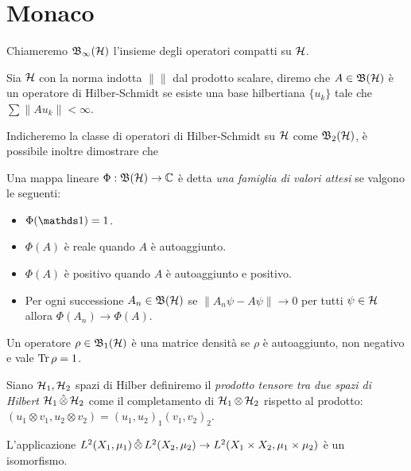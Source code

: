 \chapter{Monaco}


Chiameremo $\operatorname{\mathfrak{B}_\infty(\mathcal{H})}$ l'insieme degli operatori compatti su $\operatorname{\mathcal{H}}$.

\begin{definition}
    Sia $\operatorname{\mathcal{H}}$ con la norma indotta $\| \|$ dal prodotto scalare, diremo che $A \in \operatorname{\mathfrak{B}(\mathcal{H})}$ è un operatore di Hilber-Schmidt se esiste una base hilbertiana $\{ u_k\}$ tale che $\sum \|Au_k \|<\infty$. 
\end{definition}

Indicheremo la classe di operatori di Hilber-Schmidt su $\operatorname{\mathcal{H}}$ come $\operatorname{\mathfrak{B}_2(\mathcal{H})}$, è possibile inoltre dimostrare che 





\begin{definition}
    Una mappa lineare $\Phi : \operatorname{\mathfrak{B}(\mathcal{H})} \to \mathbb{C}$ è detta \emph{ una famiglia di valori attesi} se valgono le seguenti:

\begin{itemize}
    \item $\Phi(\un) = 1$.
    \item $\Phi(A)$ è reale quando $A$ è autoaggiunto.
    \item $\Phi(A)$ è positivo quando $A$ è autoaggiunto e positivo.
    \item Per ogni successione $A_n \in \operatorname{\mathfrak{B}(\mathcal{H})}$ se $\| A_n\psi - A \psi\| \to 0$ per tutti $\psi \in \operatorname{\mathcal{H}}$ allora $\Phi(A_n) \to \Phi(A)$.
\end{itemize}
\end{definition}

\begin{definition}
    Un operatore $\rho\in \operatorname{\mathfrak{B}_1(\mathcal{H})}$ è una matrice densità se $\rho$ è autoaggiunto, non negativo e vale $\Tr \rho =1$.
\end{definition}

\begin{definition}
    Siano $\operatorname{\mathcal{H}}_1, \operatorname{\mathcal{H}}_2$ spazi di Hilber definiremo il \emph{prodotto tensore tra due spazi di Hilbert} $\operatorname{\mathcal{H}}_1 \hat{\otimes} \operatorname{\mathcal{H}}_2$ come il completamento di $\operatorname{\mathcal{H}}_1 \otimes \operatorname{\mathcal{H}}_2$ rispetto al prodotto:
$(u_1 \otimes v_1, u_2 \otimes v_2)= (u_1, u_2)_1 (v_1, v_2)_2$.
\end{definition}



\begin{proposition}
    L'applicazione $ L^2(X_1, \mu_1) \operatorname{\hat{\otimes}} L^2(X_2, \mu_2) \to L^2(X_1 \times X_2, \mu_1 \times \mu_2) $ è un isomorfismo.
\end{proposition}

